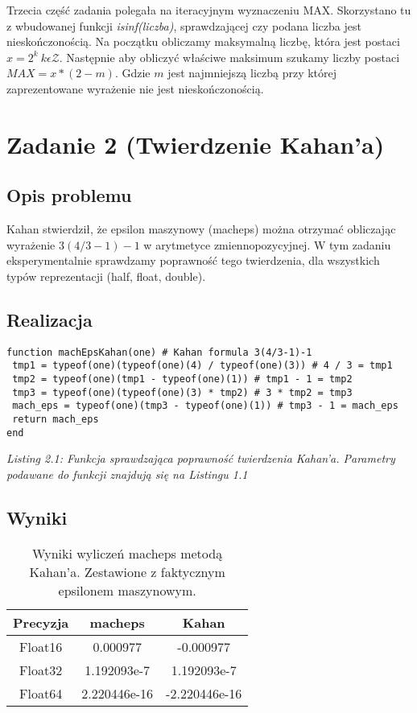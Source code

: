 \documentclass[]{article}
\begin{document}
Trzecia część zadania polegała na iteracyjnym wyznaczeniu MAX. Skorzystano tu z wbudowanej funkcji \textit{isinf(liczba)}, sprawdzającej czy podana liczba jest nieskończonością. Na początku obliczamy maksymalną liczbę, która jest postaci \(x = 2^k \: k\epsilon \mathcal{Z}\). Następnie aby obliczyć właściwe maksimum szukamy liczby postaci \(MAX = x * (2 - m)\). Gdzie \(m\) jest najmniejszą liczbą przy której zaprezentowane wyrażenie nie jest nieskończonością.

\section{Zadanie 2 (Twierdzenie Kahan'a)}
\subsection{Opis problemu}
Kahan stwierdził, że epsilon maszynowy (macheps) można otrzymać obliczając wyrażenie
\(3(4/3-1)-1\) w arytmetyce zmiennopozycyjnej. W tym zadaniu eksperymentalnie sprawdzamy poprawność tego twierdzenia, dla wszystkich typów reprezentacji (half, float, double).
\subsection{Realizacja}
\begin{lstlisting}
function machEpsKahan(one) # Kahan formula 3(4/3-1)-1 
 tmp1 = typeof(one)(typeof(one)(4) / typeof(one)(3)) # 4 / 3 = tmp1
 tmp2 = typeof(one)(tmp1 - typeof(one)(1)) # tmp1 - 1 = tmp2
 tmp3 = typeof(one)(typeof(one)(3) * tmp2) # 3 * tmp2 = tmp3
 mach_eps = typeof(one)(tmp3 - typeof(one)(1)) # tmp3 - 1 = mach_eps
 return mach_eps
end
\end{lstlisting}
\textit{Listing 2.1: Funkcja sprawdzająca poprawność twierdzenia Kahan'a. Parametry podawane do funkcji znajdują się na Listingu 1.1}
\\
\subsection{Wyniki}
\begin{table}[h]
	\centering
	\begin{tabular}{||c c c||} 
		\hline
		Precyzja & macheps & Kahan \\ [0.5ex] 
		\hline\hline
		Float16 & 0.000977 &  -0.000977\\ 
		Float32 & 1.192093e-7 & 1.192093e-7\\
		Float64 & 2.220446e-16 & -2.220446e-16 \\
		\hline
	\end{tabular}
	\caption{Wyniki wyliczeń macheps metodą Kahan'a. Zestawione z faktycznym epsilonem maszynowym.}
\end{table}
\end{document}
